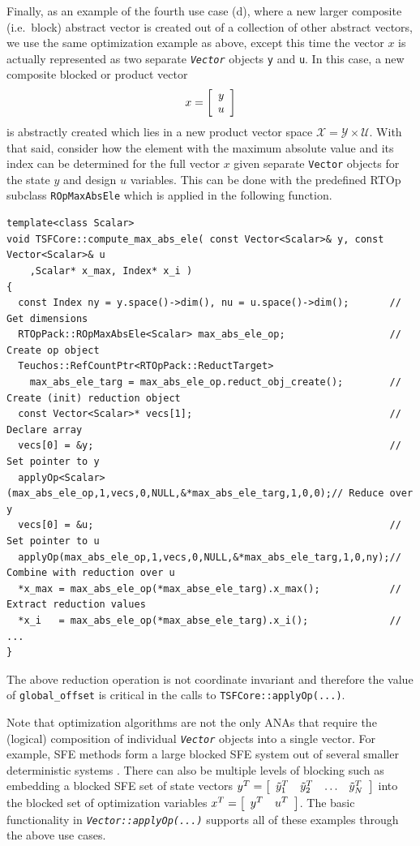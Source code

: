 {}\noindent{}Finally, as an example of the fourth use case (d), where
a new larger composite (i.e.~block) abstract vector is created out of
a collection of other abstract vectors, we use the same optimization
example as above, except this time the vector $x$ is actually
represented as two separate {}\texttt{\textit{Vector}} objects
{}\texttt{y} and {}\texttt{u}.  In this case, a new composite blocked
or product vector
%
\[
x = {\bmat{c} y \\ u \emat}
\]
%
is abstractly created which lies in a new product vector space
$\mathcal{X} = \mathcal{Y} \times \mathcal{U}$.  With that said,
consider how the element with the maximum absolute value and its index
can be determined for the full vector $x$ given separate
{}\texttt{Vector} objects for the state $y$ and design $u$ variables.
This can be done with the predefined RTOp subclass
{}\texttt{ROpMax\-AbsEle} which is applied in the following function.

{\scriptsize\begin{verbatim}
template<class Scalar>
void TSFCore::compute_max_abs_ele( const Vector<Scalar>& y, const Vector<Scalar>& u
    ,Scalar* x_max, Index* x_i )
{
  const Index ny = y.space()->dim(), nu = u.space()->dim();       // Get dimensions
  RTOpPack::ROpMaxAbsEle<Scalar> max_abs_ele_op;                  // Create op object
  Teuchos::RefCountPtr<RTOpPack::ReductTarget>
    max_abs_ele_targ = max_abs_ele_op.reduct_obj_create();        // Create (init) reduction object
  const Vector<Scalar>* vecs[1];                                  // Declare array
  vecs[0] = &y;                                                   // Set pointer to y
  applyOp<Scalar>(max_abs_ele_op,1,vecs,0,NULL,&*max_abs_ele_targ,1,0,0);// Reduce over y
  vecs[0] = &u;                                                   // Set pointer to u
  applyOp(max_abs_ele_op,1,vecs,0,NULL,&*max_abs_ele_targ,1,0,ny);// Combine with reduction over u
  *x_max = max_abs_ele_op(*max_abse_ele_targ).x_max();            // Extract reduction values
  *x_i   = max_abs_ele_op(*max_abse_ele_targ).x_i();              // ...
}
\end{verbatim}}

{}\noindent{}The above reduction operation is not coordinate invariant
and therefore the value of {}\texttt{global\_offset} is critical in
the calls to {}\texttt{TSFCore\-::applyOp(\-...)}.

Note that optimization algorithms are not the only ANAs that require
the (logical) composition of individual {}\texttt{\textit{Vector}}
objects into a single vector.  For example, SFE methods form a large
blocked SFE system out of several smaller deterministic systems
{}\cite{ref:sfe}.  There can also be multiple levels of blocking such
as embedding a blocked SFE set of state vectors $y^T = \bmat{cccc}
\tilde{y}_1^T & \tilde{y}_2^T & \ldots & \tilde{y}_N^T \emat$ into the blocked set of
optimization variables $x^T = \bmat{cc} y^T & u^T \emat$.  The basic
functionality in {}\texttt{\textit{Vector\-::applyOp(\-...)}} supports
all of these examples through the above use cases.

